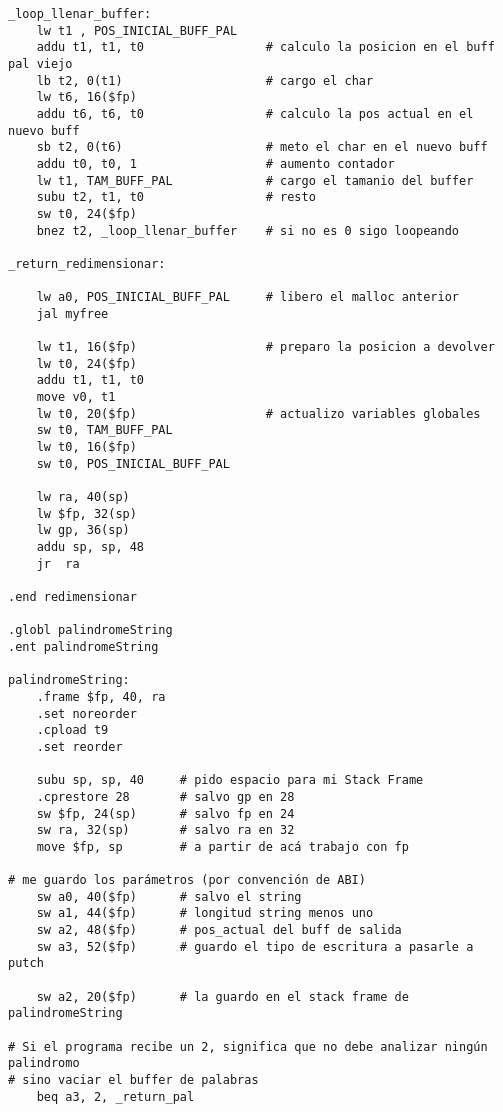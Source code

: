 \documentclass[a4paper,10pt]{article}
\begin{document}
\begin{itemize}
\begin{verbatim}
_loop_llenar_buffer:
	lw t1 , POS_INICIAL_BUFF_PAL
	addu t1, t1, t0					# calculo la posicion en el buff pal viejo
	lb t2, 0(t1)					# cargo el char
	lw t6, 16($fp)
	addu t6, t6, t0					# calculo la pos actual en el nuevo buff
	sb t2, 0(t6)					# meto el char en el nuevo buff
	addu t0, t0, 1					# aumento contador
	lw t1, TAM_BUFF_PAL				# cargo el tamanio del buffer
	subu t2, t1, t0 				# resto
	sw t0, 24($fp)
	bnez t2, _loop_llenar_buffer	# si no es 0 sigo loopeando

_return_redimensionar:

	lw a0, POS_INICIAL_BUFF_PAL		# libero el malloc anterior
	jal myfree

	lw t1, 16($fp)					# preparo la posicion a devolver
	lw t0, 24($fp)
	addu t1, t1, t0
	move v0, t1
	lw t0, 20($fp)					# actualizo variables globales
	sw t0, TAM_BUFF_PAL
	lw t0, 16($fp)
	sw t0, POS_INICIAL_BUFF_PAL

	lw ra, 40(sp)
	lw $fp, 32(sp)
	lw gp, 36(sp)
	addu sp, sp, 48
	jr	ra

.end redimensionar

.globl palindromeString
.ent palindromeString

palindromeString:
	.frame $fp, 40, ra
	.set noreorder
	.cpload t9
	.set reorder

	subu sp, sp, 40 	# pido espacio para mi Stack Frame
	.cprestore 28		# salvo gp en 28
	sw $fp, 24(sp)		# salvo fp en 24
	sw ra, 32(sp)		# salvo ra en 32
	move $fp, sp		# a partir de acá trabajo con fp
	
# me guardo los parámetros (por convención de ABI)
	sw a0, 40($fp)		# salvo el string
	sw a1, 44($fp)		# longitud string menos uno
	sw a2, 48($fp)		# pos_actual del buff de salida
	sw a3, 52($fp)		# guardo el tipo de escritura a pasarle a putch

	sw a2, 20($fp)		# la guardo en el stack frame de palindromeString

# Si el programa recibe un 2, significa que no debe analizar ningún palindromo
# sino vaciar el buffer de palabras
	beq a3, 2, _return_pal	


\end{verbatim}
\end{itemize}
\end{document}
